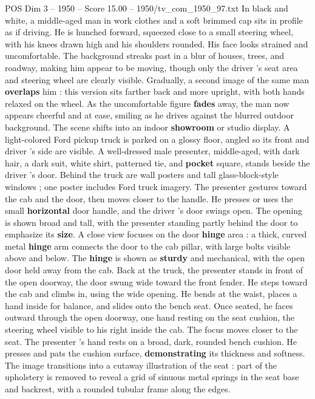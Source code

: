 \begin{textsample}{POS Dim 3 – 1950 – Score 15.00 – 1950/tv\_com\_1950\_97.txt}  \label{ex:f3_pos_007}
In black and white, a middle-aged man in work clothes and a soft brimmed cap sits in profile as if driving.
He is hunched forward, squeezed close to a small steering wheel, with his knees drawn high and his shoulders rounded.
His face looks strained and uncomfortable.
The background streaks past in a blur of houses, trees, and roadway, making him appear to be moving, though only the driver ’s seat area and steering wheel are clearly visible.
Gradually, a second image of the same man \textbf{overlaps} him : this version sits farther back and more upright, with both hands relaxed on the wheel.
As the uncomfortable figure \textbf{fades} away, the man now appears cheerful and at ease, smiling as he drives against the blurred outdoor background.
The scene shifts into an indoor \textbf{showroom} or studio display.
A light-colored Ford pickup truck is parked on a glossy floor, angled so its front and driver ’s side are visible.
A well-dressed male presenter, middle-aged, with dark hair, a dark suit, white shirt, patterned tie, and \textbf{pocket} square, stands beside the driver ’s door.
Behind the truck are wall posters and tall glass-block-style windows ; one poster includes Ford truck imagery.
The presenter gestures toward the cab and the door, then moves closer to the handle.
He presses or uses the small \textbf{horizontal} door handle, and the driver ’s door swings open.
The opening is shown broad and tall, with the presenter standing partly behind the door to emphasize its \textbf{size}.
A close view focuses on the door \textbf{hinge} area : a thick, curved metal \textbf{hinge} arm connects the door to the cab pillar, with large bolts visible above and below.
The \textbf{hinge} is shown as \textbf{sturdy} and mechanical, with the open door held away from the cab.
Back at the truck, the presenter stands in front of the open doorway, the door swung wide toward the front fender.
He steps toward the cab and climbs in, using the wide opening.
He bends at the waist, places a hand inside for balance, and slides onto the bench seat.
Once seated, he faces outward through the open doorway, one hand resting on the seat cushion, the steering wheel visible to his right inside the cab.
The focus moves closer to the seat.
The presenter ’s hand rests on a broad, dark, rounded bench cushion.
He presses and pats the cushion surface, \textbf{demonstrating} its thickness and softness.
The image transitions into a cutaway illustration of the seat : part of the upholstery is removed to reveal a grid of sinuous metal springs in the seat base and backrest, with a rounded tubular frame along the edges.

\end{textsample}
